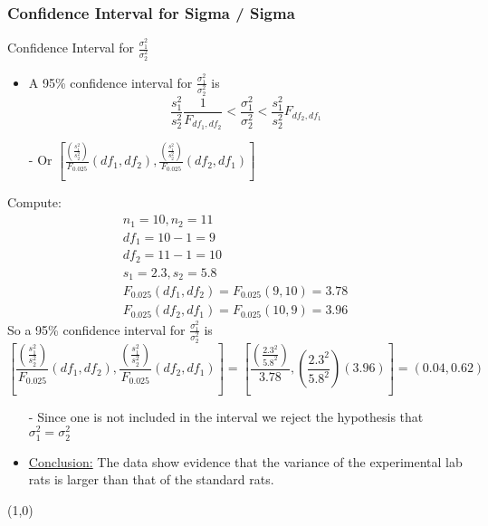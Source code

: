 \documentclass[12pt, letterpaper]{article}
\begin{document}
            \subsubsection{Confidence Interval for Sigma / Sigma}
                \begin{mdframed}[leftmargin=0.5cm, rightmargin=0.5cm]
                    Confidence Interval for $\frac{\sigma_1^2}{\sigma_2^2}$
                    \begin{itemize}
                        \item A 95\% confidence interval for $\frac{\sigma_1^2}{\sigma_2^2}$ is $$\frac{s_1^2}{s_2^2} \frac{1}{F_{df_1,df_2}} < \frac{\sigma_1^2}{\sigma_2^2} < \frac{s_1^2}{s_2^2} F_{df_2, df_1}$$
                        \item[-] Or $\left[\frac{\left(\frac{s_1^2}{s_2^2}\right)}{F_{0.025}}(df_1,df_2), \frac{\left(\frac{s_1^2}{s_2^2}\right)}{F_{0.025}}(df_2,df_1)\right]$
                    \end{itemize}
                    Compute:
                    \begin{align*}
                        n_1 = 10, n_2 = 11 \\
                        df_1 = 10 - 1 = 9 \\
                        df_2 = 11 - 1 = 10 \\
                        s_1 = 2.3, s_2 = 5.8 \\
                        F_{0.025}(df_1, df_2) = F_{0.025}(9, 10) = 3.78 \\
                        F_{0.025}(df_2, df_1) = F_{0.025}(10, 9) = 3.96
                    \end{align*}
                    So a 95\% confidence interval for $\frac{\sigma_1^2}{\sigma_2^2}$ is
                    \begin{equation*}
                        \left[\frac{\left(\frac{s_1^2}{s_2^2}\right)}{F_{0.025}}(df_1,df_2), \frac{\left(\frac{s_1^2}{s_2^2}\right)}{F_{0.025}}(df_2,df_1)\right] = \left[\frac{\left(\frac{2.3^2}{5.8^2}\right)}{3.78}, \left(\frac{2.3^2}{5.8^2}\right)(3.96)\right] = (0.04, 0.62)
                    \end{equation*}
                    \begin{itemize}
                        \item[-] Since one is not included in the interval we reject the hypothesis that $\sigma_1^2 = \sigma_2^2$
                        \item \underline{Conclusion:} The data show evidence that the variance of the experimental lab rats is larger than that of the standard rats.
                    \end{itemize}
                \end{mdframed}
\vspace{4.5cm}
\line(1,0){\linewidth}
\end{document}
